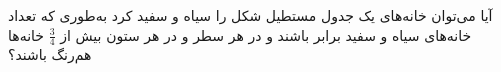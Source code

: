     \p 
آیا می‌توان خانه‌های یک جدول مستطیل شکل را سیاه و سفید کرد به‌طوری که تعداد خانه‌های سیاه و سفید برابر باشند و در هر سطر و در هر ستون بیش از
$\frac{3}{4}$
خانه‌ها هم‌رنگ باشند؟